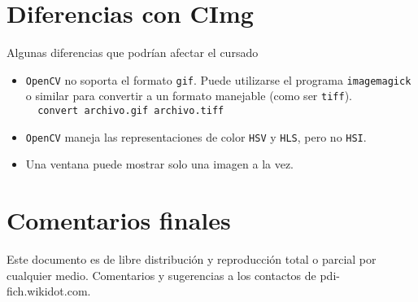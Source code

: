 \documentclass[oneside,a4paper]{book}
\newcommand{\tc}[1]{\texttt{#1}}
\begin{document}
	\section{Diferencias con CImg}
		Algunas diferencias que podrían afectar el cursado
		\begin{itemize}
			\item \tc{OpenCV} no soporta el formato \tc{gif}. Puede utilizarse el programa \tc{imagemagick} o similar para convertir a un formato manejable (como ser \tc{tiff}).\\
				\verb|  convert archivo.gif archivo.tiff|
			\item \tc{OpenCV} maneja las representaciones de color \tc{HSV} y \tc{HLS}, pero no \tc{HSI}.
			\item Una ventana puede mostrar solo una imagen a la vez.
		\end{itemize}
	\section{Comentarios finales}
		Este documento es de libre distribución y reproducción total o parcial por cualquier medio. Comentarios y sugerencias a los contactos de pdi-fich.wikidot.com.

	\mainmatter
	\let\thesection\theoldsection
\end{document}
